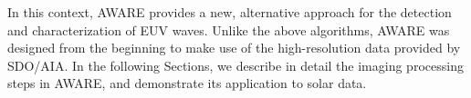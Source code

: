 In this context, AWARE provides a new, alternative approach for the
detection and characterization of EUV waves. Unlike the above
algorithms, AWARE was designed from the beginning to make use of the
high-resolution data provided by SDO/AIA. In the following Sections,
we describe in detail the imaging processing steps in AWARE, and
demonstrate its application to solar data.
